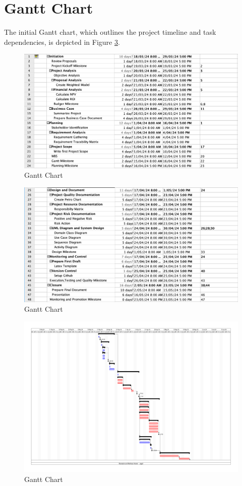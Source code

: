 \section{Gantt Chart}

The initial Gantt chart, which outlines the project timeline and task dependencies, is depicted in Figure \ref{fig:gnt_chart}.

\begin{figure}[ht]
    \includegraphics[width=\textwidth]{images/gantt_fill_1.png}
    \caption{Gantt Chart}
    \label{fig:gnt3}
\end{figure}

\begin{figure}[ht]
    \includegraphics[width=\textwidth]{images/gantt_fill_2.png}
    \caption{Gantt Chart}
    \label{fig:gnt4}
\end{figure}

\begin{figure}[ht]
    \includegraphics[width=\textwidth]{images/gantt_chart.png}
    \caption{Gantt Chart}
    \label{fig:gnt_chart}
\end{figure}



\FloatBarrier
\newpage